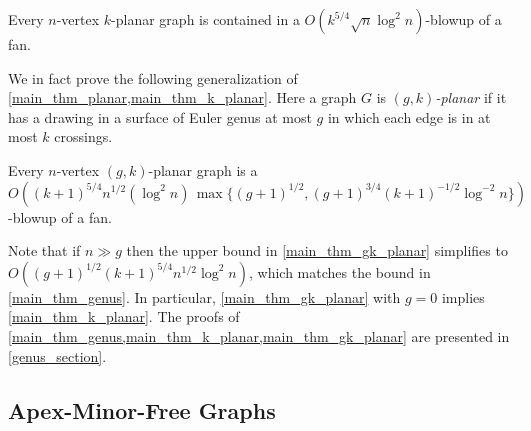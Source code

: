 \documentclass{patmorin}
\renewcommand{\geq}{\geqslant}
\newcommand{\david}[1]{{\color{orange} David: #1}}
\newcommand{\gwen}[1]{\textcolor{Purple}{Gwen: #1}}
\newcommand{\defin}[1]{\emph{\textcolor{brightmaroon}{#1}}}
\begin{document}
\begin{thm}\label{main_thm_k_planar}
  Every $n$-vertex $k$-planar graph is contained in a $O(k^{5/4}\sqrt{n}\log^2 n)$-blowup of a fan.
\end{thm}

We in fact prove the following generalization of \cref{main_thm_planar,main_thm_k_planar}. Here a graph $G$ is \defin{$(g,k)$-planar} if it has a drawing in a surface of Euler genus at most $g$ in which each edge is in at most $k$ crossings.

\begin{thm}
\label{main_thm_gk_planar}
Every $n$-vertex $(g,k)$-planar graph is a $O( (k+1)^{5/4}n^{1/2}(\log^2 n) \, \max\{ (g+1)^{1/2},(g+1)^{3/4}(k+1)^{-1/2} \log^{-2} n\} )$-blowup of a fan.
\end{thm}



Note that if $n\gg g$ then the upper bound in
\cref{main_thm_gk_planar} simplifies to  $O( (g+1)^{1/2}(k+1)^{5/4}n^{1/2}\log^2 n )$, which matches the bound in \cref{main_thm_genus}. In particular, \cref{main_thm_gk_planar} with $g=0$ implies \cref{main_thm_k_planar}.  The proofs of \cref{main_thm_genus,main_thm_k_planar,main_thm_gk_planar} are presented in \cref{genus_section}.


%



\subsection{Apex-Minor-Free Graphs}
\end{document}
